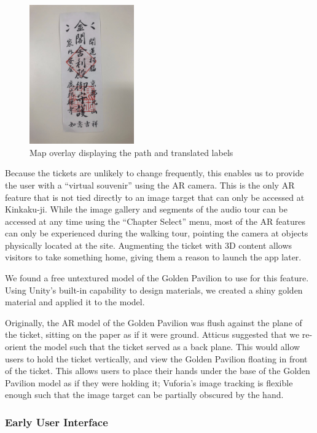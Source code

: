 \documentclass[a4paper, 10pt, american, titlepage]{article}
\begin{document}
\begin{figure}[h] \centering
    \includegraphics[width=0.4\textwidth]{kinkakuji-ticket.jpeg}
    \caption{Map overlay displaying the path and translated labels}
    \label{fig:kinkakujiTicket}
\end{figure}

Because the tickets are unlikely to change frequently, this enables us to
provide the user with a ``virtual souvenir'' using the AR camera. This is the
only AR feature that is not tied directly to an image target that can only be
accessed at Kinkaku-ji. While the image gallery and segments of the audio tour
can be accessed at any time using the ``Chapter Select'' menu, most of the AR
features can only be experienced during the walking tour, pointing the camera at
objects physically located at the site. Augmenting the ticket with 3D content
allows visitors to take something home, giving them a reason to launch the app
later.

We found a free untextured model of the Golden Pavilion to use for this
feature. Using Unity's built-in capability to design materials, we created
a shiny golden material and applied it to the model.

Originally, the AR model of the Golden Pavilion was flush against the plane of
the ticket, sitting on the paper as if it were ground. Atticus suggested that we
re-orient the model such that the ticket served as a back plane. This would
allow users to hold the ticket vertically, and view the Golden Pavilion floating
in front of the ticket. This allows users to place their hands under the base of
the Golden Pavilion model as if they were holding it; Vuforia's image tracking
is flexible enough such that the image target can be partially obscured by the
hand.

\subsubsection{Early User Interface}
\label{sec:earlyUserInterface}
\end{document}
